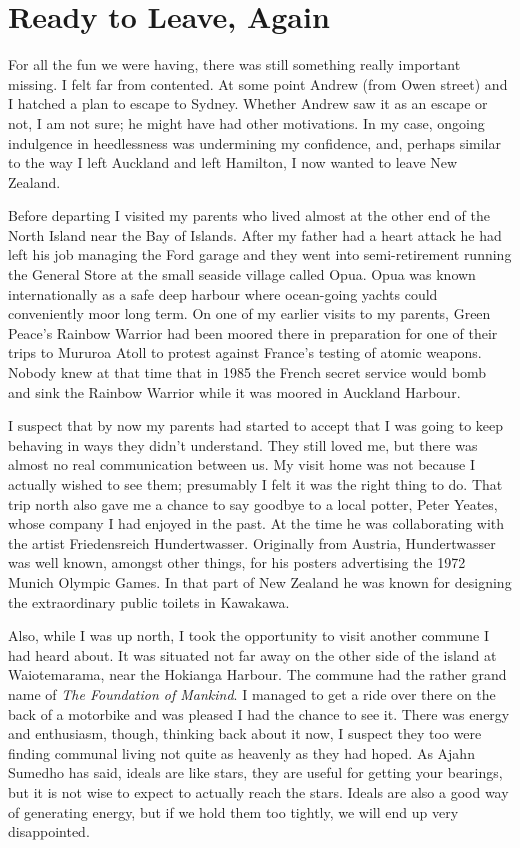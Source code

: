 \chapter{Ready to Leave, Again}

\enlargethispage{\baselineskip}

For all the fun we were having, there was still something really
important missing. I felt far from contented. At some point Andrew (from
Owen street) and I hatched a plan to escape to Sydney. Whether Andrew
saw it as an escape or not, I am not sure; he might have had other
motivations. In my case, ongoing indulgence in heedlessness was
undermining my confidence, and, perhaps similar to the way I left
Auckland and left Hamilton, I now wanted to leave New Zealand.

Before departing I visited my parents who lived almost at the other end
of the North Island near the Bay of Islands. After my father had a heart
attack he had left his job managing the Ford garage and they went into
semi-retirement running the General Store at the small seaside village
called Opua. Opua was known internationally as a safe deep harbour where
ocean-going yachts could conveniently moor long term. On one of my
earlier visits to my parents, Green Peace's Rainbow Warrior had been
moored there in preparation for one of their trips to Mururoa Atoll to
protest against France's testing of atomic weapons. Nobody knew at that
time that in 1985 the French secret service would bomb and sink the
Rainbow Warrior\cite{rainbow} while it was moored in Auckland Harbour.

\enlargethispage{\baselineskip}

I suspect that by now my parents had started to accept that I was going
to keep behaving in ways they didn't understand. They still loved me,
but there was almost no real communication between us. My visit home was
not because I actually wished to see them; presumably I felt it was the
right thing to do. That trip north also gave me a chance to say goodbye
to a local potter, Peter Yeates, whose company I had enjoyed in the
past. At the time he was collaborating with the artist Friedensreich
Hundertwasser. Originally from Austria, Hundertwasser was well known,
amongst other things, for his posters advertising the
1972 Munich Olympic Games\cite{olympic}.
In that part of New Zealand he was known for designing the extraordinary
public toilets in Kawakawa\cite{toilets}.

Also, while I was up north, I took the opportunity to visit another
commune I had heard about. It was situated not far away on the other
side of the island at Waiotemarama, near the Hokianga Harbour. The
commune had the rather grand name of \emph{The Foundation of Mankind}. I
managed to get a ride over there on the back of a motorbike and was
pleased I had the chance to see it. There was energy and enthusiasm,
though, thinking back about it now, I suspect they too were finding
communal living not quite as heavenly as they had hoped. As Ajahn
Sumedho has said, ideals are like stars, they are useful for getting
your bearings, but it is not wise to expect to actually reach the stars.
Ideals are also a good way of generating energy, but if we hold them too
tightly, we will end up very disappointed.

